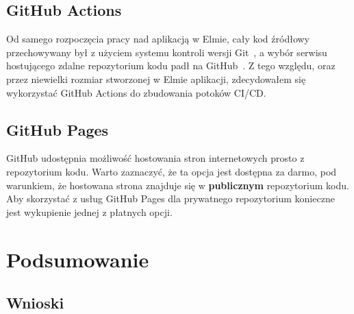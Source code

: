 \documentclass[twoside,a4paper]{report}
\begin{document}
\section{GitHub Actions}
Od samego rozpoczęcia pracy nad aplikacją w Elmie, cały kod źródłowy przechowywany był z użyciem systemu kontroli wersji Git~\cite{git}, a wybór serwisu hostującego zdalne repozytorium kodu padł na GitHub~\cite{github}. Z tego względu, oraz przez niewielki rozmiar stworzonej w Elmie aplikacji, zdecydowałem się wykorzystać GitHub Actions do zbudowania potoków CI/CD\@.

\section{GitHub Pages}
GitHub udostępnia możliwość hostowania stron internetowych prosto z repozytorium kodu. Warto zaznaczyć, że ta opcja jest dostępna za darmo, pod warunkiem, że hostowana strona znajduje się w \textbf{publicznym} repozytorium kodu. Aby skorzystać z usług GitHub Pages dla prywatnego repozytorium konieczne jest wykupienie jednej z płatnych opcji.


\chapter{Podsumowanie}

\section{Wnioski}


\listoffigures
\lstlistoflistings{}

\printbibliography{}

\end{document}
